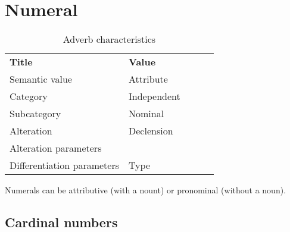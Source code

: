 \section{Numeral}

\begin{table}[h]
	\caption{Adverb characteristics}
	\begin{tabular}{lllll}
		\textbf{Title}              & \textbf{Value}      \\
		Semantic value              & Attribute           \\
		Category                    & Independent         \\
		Subcategory                 & Nominal             \\
		Alteration                  & Declension          \\
		Alteration parameters       &               \\
		Differentiation parameters  & Type
	\end{tabular}
\end{table}

Numerals can be attributive (with a nount) or pronominal (without a noun).
	







\subsection{Cardinal numbers}

